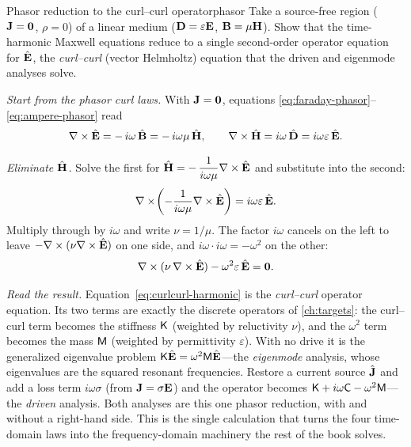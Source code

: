 \begin{workedexample}{Phasor reduction to the curl--curl operator}{phasor}
Take a source-free region ($\mathbf{J}=\bm0$, $\rho=0$) of a linear medium
($\mathbf{D}=\varepsilon\mathbf{E}$, $\mathbf{B}=\mu\mathbf{H}$). Show that the time-harmonic Maxwell
equations reduce to a single second-order operator equation for $\hat{\mathbf{E}}$,
the \emph{curl--curl} (vector Helmholtz) equation that the driven and eigenmode
analyses solve.

\emph{Start from the phasor curl laws.} With $\mathbf{J}=\bm0$, equations
\eqref{eq:faraday-phasor}--\eqref{eq:ampere-phasor} read
\[
  \nabla\times\hat{\mathbf{E}} = -\,i\omega\,\hat{\mathbf{B}} = -\,i\omega\mu\,\hat{\mathbf{H}},
  \qquad
  \nabla\times\hat{\mathbf{H}} = i\omega\,\hat{\mathbf{D}} = i\omega\varepsilon\,\hat{\mathbf{E}}.
\]

\emph{Eliminate $\hat{\mathbf{H}}$.} Solve the first for $\hat{\mathbf{H}}=
-\,\dfrac{1}{i\omega\mu}\nabla\times\hat{\mathbf{E}}$ and substitute into the second:
\[
  \nabla\times\!\left(-\frac{1}{i\omega\mu}\nabla\times\hat{\mathbf{E}}\right)
    = i\omega\varepsilon\,\hat{\mathbf{E}}.
\]
Multiply through by $i\omega$ and write $\nu=1/\mu$. The factor $i\omega$ cancels
on the left to leave $-\nabla\times(\nu\nabla\times\hat{\mathbf{E}})$ on one side, and $i\omega\cdot
i\omega = -\omega^2$ on the other:
\begin{equation}
  \nabla\times(\nu\,\nabla\times\hat{\mathbf{E}}) - \omega^2\varepsilon\,\hat{\mathbf{E}} = \bm0.
  \label{eq:curlcurl-harmonic}
\end{equation}

\emph{Read the result.} Equation~\eqref{eq:curlcurl-harmonic} is the
\emph{curl--curl} operator equation. Its two terms are exactly the discrete
operators of \cref{ch:targets}: the curl--curl term becomes the stiffness
$\mathsf{K}$ (weighted by reluctivity $\nu$), and the $\omega^2$ term becomes the
mass $\mathsf{M}$ (weighted by permittivity $\varepsilon$). With no drive it is the
generalized eigenvalue problem $\mathsf{K}\hat{\mathbf{E}}=\omega^2\mathsf{M}\hat{\mathbf{E}}$---the
\emph{eigenmode} analysis, whose eigenvalues are the squared resonant
frequencies. Restore a current source $\hat{\mathbf{J}}$ and add a loss term
$i\omega\sigma$ (from $\mathbf{J}=\sigma\mathbf{E}$) and the operator becomes
$\mathsf{K}+i\omega\mathsf{C}-\omega^2\mathsf{M}$---the \emph{driven} analysis. Both
analyses are this one phasor reduction, with and without a right-hand side.
This is the single calculation that turns the four time-domain laws into the
frequency-domain machinery the rest of the book solves.
\end{workedexample}

